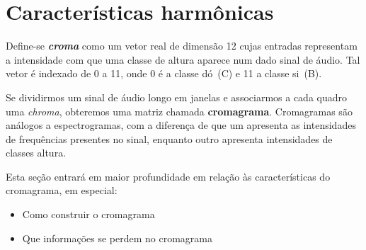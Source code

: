 \section{Características harmônicas}
\label{sec:cromagramas}
    Define-se \textbf{\textit{croma}} como um vetor real de dimensão 12 cujas entradas representam a intensidade com que uma classe de altura aparece num dado sinal de áudio. Tal vetor é indexado de 0 a 11, onde 0 é a classe dó~(C) e 11 a classe si~(B).
    
    Se dividirmos um sinal de áudio longo em janelas e associarmos a cada quadro uma \textit{chroma}, obteremos uma matriz chamada \textbf{cromagrama}. Cromagramas são análogos a espectrogramas, com a diferença de que um apresenta as intensidades de frequências presentes no sinal, enquanto outro apresenta intensidades de classes altura.

    Esta seção entrará em maior profundidade em relação às características do cromagrama, em especial:

    \begin{itemize}
        \item Como construir o cromagrama
        \item Que informações se perdem no cromagrama
    \end{itemize}


